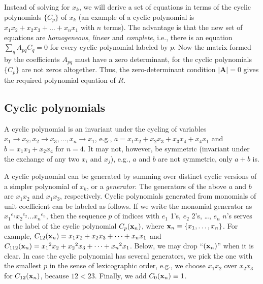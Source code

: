 \documentclass{ws-ijbc}
\begin{document}
Instead of solving  for $x_k$,
  we will derive a set of equations
  in terms of the cyclic polynomials $\{C_p\}$ of $x_k$
  (an example of a cyclic polynomial is
  $x_1 x_2 + x_2 x_3 + \dots + x_n x_1$
  with $n$ terms).
%
The advantage is that the new set of equations are
  \emph{homogeneous}, \emph{linear} and \emph{complete},
  i.e., there is an equation
  $\sum_q A_{pq} C_q = 0$ for every cyclic polynomial labeled by $p$.
%
Now the matrix formed by the coefficients $A_{pq}$
  must have a zero determinant,
  for the cyclic polynomials $\{C_p\}$ are not zeros altogether.
%
Thus, the zero-determinant condition $|\mathbf A| = 0$ gives
  the required polynomial equation of $R$.
%


\subsection{\label{sec:cyclic}Cyclic polynomials}


A cyclic polynomial is an invariant
  under the cycling of variables
  $x_1 \rightarrow x_2, x_2 \rightarrow x_3,
  \ldots, x_n \rightarrow x_1$,
  e.g., $a = x_1 x_2 + x_2 x_3 + x_3 x_4 + x_4 x_1$
  and $b = x_1 x_3 + x_2 x_4$ for $n = 4$.
%
It may not, however, be symmetric
  (invariant under the exchange of any two $x_i$ and $x_{j}$),
  e.g., $a$ and $b$ are not symmetric,
  only $a + b$ is.


A cyclic polynomial can be generated by summing over
  distinct cyclic versions of a simpler polynomial of $x_k$, or a \emph{generator}.
The generators of the above $a$ and $b$
  are $x_1 x_2$ and $x_1 x_3$, respectively.
%
%
%
Cyclic polynomials
  generated from monomials of unit coefficient
  can be labeled as follows.
If we write the monomial generator as
  ${x_1}^{e_1} {x_2}^{e_2} \dots {x_n}^{e_n}$,
  then the sequence $p$ of indices with
  $e_1$ 1's, $e_2$ 2's, \ldots, $e_n$ $n$'s
  serves as the label of the cyclic polynomial $C_p(\mathbf{x}_{n})$,
  where $\mathbf{x}_{n} \equiv \{x_1, \ldots, x_n\}$.
%
For example,
$C_{12}(\mathbf{x}_{n})  = x_1 x_2 + x_2 x_3 + \dots + x_n x_1$
and
$C_{112}(\mathbf{x}_{n}) = {x_1}^2 x_2 + {x_2}^2 x_3 + \dots + {x_n}^2 x_1$.
%
Below, we may drop %
  ``$(\mathbf{x}_{n})$'' when it is clear.
In case the cyclic polynomial has several generators,
  we pick the one with the smallest $p$
  in the sense of lexicographic order,
  e.g., we choose $x_1 x_2$ over $x_2 x_3$ for $C_{12}(\mathbf{x}_{n})$,
  because $12 < 23$.
%
Finally, we add $C_0(\mathbf{x}_{n}) \equiv 1$.
%
%
%
\end{document}
